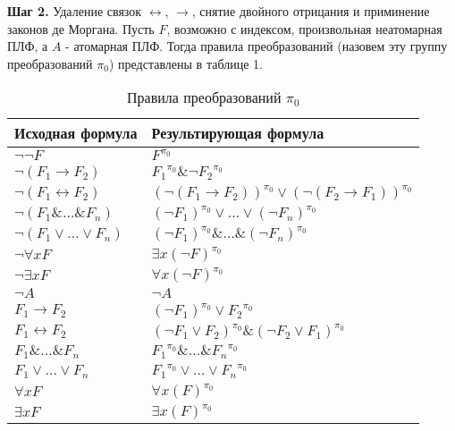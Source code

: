 \documentclass[a4paper]{jctart15b}
\begin{document}
\textbf{Шаг 2.} Удаление связок $\leftrightarrow$, $\rightarrow$, снятие двойного отрицания и приминение законов де Моргана. Пусть $F$, возможно с индексом, произвольная неатомарная ПЛФ, а $A$ - атомарная ПЛФ. Тогда правила преобразований (назовем эту группу преобразований $\pi_0$) представлены в таблице 1.

\begin{table}[htbp]
	\caption{Правила преобразований $\pi_0$}\vspace*{2mm}
	
	\begin{tabular}{|l|l|}
		\hline
		\textbf{Исходная формула} & \textbf{Результирующая формула} \\
		\hline
		$\neg\neg F$ & $F^{\pi_0}$ \\
		
		\hline
		$\neg (F_1 \rightarrow F_2)$ & ${F_1}^{\pi_0} \& {\neg F_2}^{\pi_0}$ \\
		
		\hline
		$\neg (F_1 \leftrightarrow F_2)$ & $(\neg(F_1 \rightarrow F_2))^{\pi_0} \vee (\neg(F_2 \rightarrow F_1))^{\pi_0}$ \\
		
		\hline
		$\neg (F_1 \&\ldots\& F_n)$ & $(\neg F_1)^{\pi_0} \vee\ldots\vee (\neg F_n)^{\pi_0}$ \\
		
		\hline
		$\neg (F_1 \vee\ldots\vee F_n)$ & $(\neg F_1)^{\pi_0} \&\ldots\& (\neg F_n)^{\pi_0}$ \\
		
		\hline
		$\neg\forall{x}F$ & $\exists{x}(\neg F)^{\pi_0}$ \\ 
		
		\hline
		$\neg\exists{x}F$ & $\forall{x}(\neg F)^{\pi_0}$ \\
		
		\hline
		$\neg A$ & $\neg A$ \\
		
		\hline
		$F_1 \rightarrow F_2$ & $(\neg F_1)^{\pi_0} \vee {F_2}^{\pi_0}$ \\
		
		\hline
		$F_1 \leftrightarrow F_2$ & $(\neg F_1 \vee F_2)^{\pi_0} \& (\neg F_2 \vee F_1)^{\pi_0} $ \\
		
		\hline
		$F_1 \&\ldots\& F_n$ & ${F_1}^{\pi_0} \&\ldots\& {F_n}^{\pi_0} $ \\
		
		\hline
		$F_1 \vee\ldots\vee F_n$ & ${F_1}^{\pi_0} \vee\ldots\vee {F_n}^{\pi_0} $ \\
		
		\hline
		$\forall{x}F$ & $\forall{x}(F)^{\pi_0} $ \\
		
		\hline
		$\exists{x}F$ & $\exists{x}(F)^{\pi_0} $ \\
		
		\hline
	\end{tabular}
\end{table}
\end{document}
